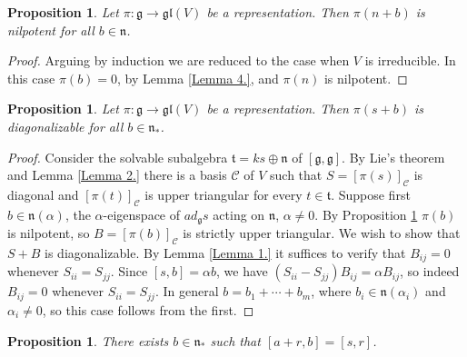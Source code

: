 \documentclass{amsart}
\newtheorem{proposition}[theorem]{Proposition}
\theoremstyle{definition}
\theoremstyle{remark}
\numberwithin{equation}{section}
\newcommand \g{{\mathfrak g}}
\def \n{{\mathfrak n}}
\renewcommand \t{{\mathfrak t}}
\newcommand \D{{\mathcal C}}
\newcommand \gl{{\mathfrak {gl}}}
\begin{document}
\medskip

\begin{proposition}\label{Proposition 1.}
 Let $\pi:\g\to\gl(V)$ be a representation.
Then $\pi(n+b)$ is nilpotent for all $b\in \n$.
\end{proposition}


\begin{proof}
 Arguing by induction we are reduced to the case when $V$ is irreducible.
In this case $\pi(b)=0$, by Lemma \ref{Lemma 4.}, and $\pi(n)$ is nilpotent. \end{proof}

\begin{proposition}\label{Proposition 2.}
 Let $\pi:\g\to\gl(V)$ be a representation.
Then $\pi(s+b)$ is diagonalizable for all $b\in \n_*$.
\end{proposition}

\begin{proof}
Consider the solvable subalgebra $\t=k s\oplus \n$ of $[\g,\g]$.
By Lie's theorem and Lemma \ref{Lemma 2.} there is a basis $\D$ of $V$ such that $S=[\pi(s)]_\D$
is diagonal and $[\pi(t)]_\D$ is upper triangular for every $t\in \t$.
Suppose first $b\in\n(\alpha)$, the
$\alpha$-eigenspace of  $ad_{\g} s$ acting on $\n$, $\alpha\neq 0$.
By Proposition \ref{Proposition 1.} $\pi(b)$ is
nilpotent, so $B=[\pi(b)]_\D$ is strictly upper triangular.
We wish to show that $S+B$ is diagonalizable.
By Lemma \ref{Lemma 1.} it suffices to verify that $B_{ij}=0$ whenever $S_{ii}=S_{jj}$.
Since $[s,b]=\alpha b$, we have
$(S_{ii}-S_{jj})B_{ij}=\alpha B_{ij}$, so indeed $B_{ij}=0$ whenever $S_{ii}=S_{jj}$.
In general $b=b_1+\cdots+b_m$,
where $b_i\in\n(\alpha_i)$ and $\alpha_i\neq 0$, so this case follows from the first.
\end{proof}



\begin{proposition}\label{Proposition 3.}
 There exists $b\in\n_*$ such that $[a+r,b]=[s,r]$.
\end{proposition}
\end{document}
